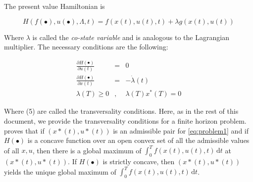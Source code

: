 The present value Hamiltonian is

\begin{equation}
H(f(\bullet), u(\bullet), \Lambda, t) = f(x(t), u(t),t) + \lambda g(x(t),u(t))
\end{equation}

Where $\lambda$ is called the \textit{co-state variable} and is analogous to the Lagrangian multiplier. The necessary conditions are the following:

\begin{eqnarray}
\frac{\partial H(\bullet)}{\partial u(t)} &=& 0 \\
\frac{\partial H(\bullet)}{\partial x(t)} &=& -\dot{\lambda}(t) \\
\lambda (T) \geq 0 &,& \lambda (T) x^*(T) = 0  
\end{eqnarray}

Where (5) are called the transversality conditions. Here, as in the rest of this document, we provide the transversality conditions for a finite horizon problem. \\

\citep {mangasarian1966sufficient} proves that if $(x*(t),u*(t))$ is an admissible pair for \ref{eq:problem1} and if $ H(\bullet)$  is a concave function over an open convex set of all the admissible values of  all $x, u$, then there is a global maximum of $ \int_0^T \! f(x(t),u(t),t) \, \mathrm{d}t$ at $(x*(t),u*(t))$. If $ H(\bullet)$ is strictly concave, then $(x*(t),u*(t))$  yields the unique global maximum of  $ \int_0^T \! f(x(t),u(t),t) \, \mathrm{d}t$.
